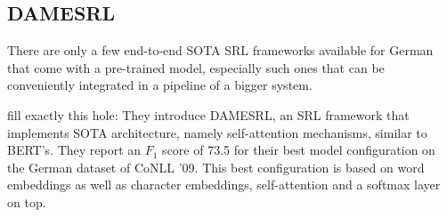 

\subsection{DAMESRL}

There are only a few end-to-end SOTA SRL frameworks available for German that come with a pre-trained model,
especially such ones that can be conveniently integrated in a pipeline of a bigger system.

\cite{do2018flexible} fill exactly this hole: They introduce DAMESRL, an SRL framework
that implements SOTA architecture, namely self-attention mechanisms, similar to BERT's.
They report an $F_1$ score of 73.5 for their best model configuration on the German dataset
of CoNLL '09. This best configuration is based on word embeddings as well as character
embeddings, self-attention and a softmax layer on top.

